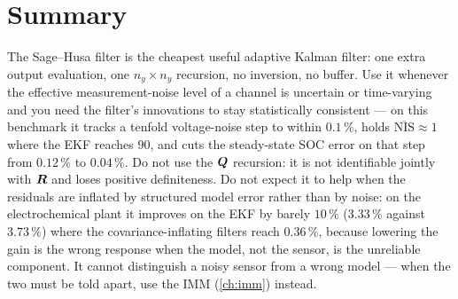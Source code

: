 \section{Summary}
The Sage--Husa filter is the cheapest useful adaptive Kalman filter: one extra output evaluation,
one $n_y\times n_y$ recursion, no inversion, no buffer.  Use it whenever the effective
measurement-noise level of a channel is uncertain or time-varying and you need the filter's
innovations to stay statistically consistent --- on this benchmark it tracks a tenfold voltage-noise
step to within $0.1\,\%$, holds $\overline{\mathrm{NIS}}\approx 1$ where the EKF reaches $90$, and
cuts the steady-state SOC error on that step from $0.12\,\%$ to $0.04\,\%$.
Do not use the $\bm{Q}$ recursion: it is not identifiable jointly with $\bm{R}$ and loses positive
definiteness.  Do not expect it to help when the residuals are inflated by structured model error rather than by
noise: on the electrochemical plant it improves on the EKF by barely $10\,\%$ ($3.33\,\%$ against
$3.73\,\%$) where the covariance-inflating filters reach $0.36\,\%$, because lowering the gain is
the wrong response when the model, not the sensor, is the unreliable component.  It cannot
distinguish a noisy sensor from a wrong model --- when the two must be told apart, use the IMM
(\cref{ch:imm}) instead.
